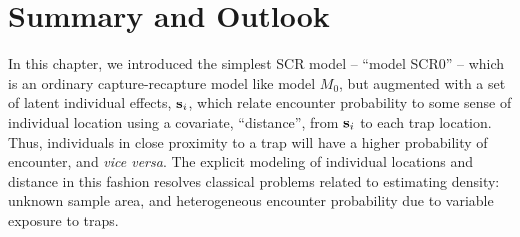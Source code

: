 {



\section{ Summary and Outlook }

In this chapter, we introduced the simplest SCR model -- ``model
SCR0'' -- which is an ordinary capture-recapture model like model
$M_0$, but augmented with a set of latent individual effects, ${\bf
  s}_{i}$, which relate encounter probability to some sense of
individual location using a covariate, ``distance'', from ${\bf
  s}_{i}$ to each trap location.  Thus, individuals in close proximity
to a trap will have a higher probability of encounter, and {\it vice
  versa}.  The explicit modeling of individual locations and distance
in this fashion resolves classical problems related to estimating
density: unknown sample area, and heterogeneous encounter probability
due to variable exposure to traps.

}
